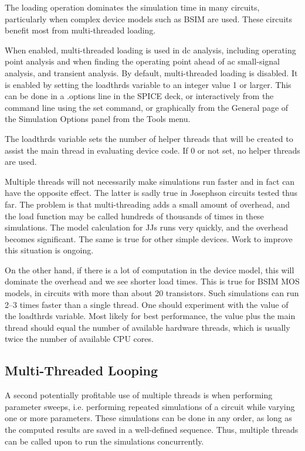 The loading operation dominates the simulation time in many circuits,
particularly when complex device models such as BSIM are used.  These
circuits benefit most from multi-threaded loading.

When enabled, multi-threaded loading is used in dc analysis, including
operating point analysis and when finding the operating point ahead of
ac small-signal analysis, and transient analysis.  By default,
multi-threaded loading is disabled.  It is enabled by setting the {\et
loadthrds} variable to an integer value 1 or larger.  This can be done
in a {\vt .options} line in the SPICE deck, or interactively from the
command line using the {\cb set} command, or graphically from the {\cb
General} page of the {\cb Simulation Options} panel from the {\cb
Tools} menu.

The {\et loadthrds} variable sets the number of helper threads that
will be created to assist the main thread in evaluating device code. 
If 0 or not set, no helper threads are used.

Multiple threads will not necessarily make simulations run faster and
in fact can have the opposite effect.  The latter is sadly true in
Josephson circuits tested thus far.  The problem is that
multi-threading adds a small amount of overhead, and the load function
may be called hundreds of thousands of times in these simulations. 
The model calculation for JJs runs very quickly, and the overhead
becomes significant.  The same is true for other simple devices.  Work
to improve this situation is ongoing.

On the other hand, if there is a lot of computation in the device
model, this will dominate the overhead and we see shorter load times. 
This is true for BSIM MOS models, in circuits with more than about 20
transistors.  Such simulations can run 2--3 times faster than a single
thread.  One should experiment with the value of the {\et loadthrds}
variable.  Most likely for best performance, the value plus the main
thread should equal the number of available hardware threads, which is
usually twice the number of available CPU cores.

\subsection{Multi-Threaded Looping}

A second potentially profitable use of multiple threads is when
performing parameter sweeps, i.e. performing repeated simulations of a
circuit while varying one or more parameters.  These simulations can
be done in any order, as long as the computed results are saved in a
well-defined sequence.  Thus, multiple threads can be called upon to
run the simulations concurrently.

